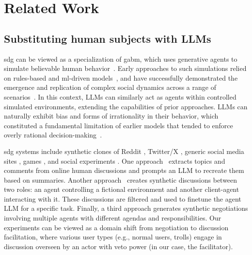 %
\section{Related Work}

\subsection{Substituting human subjects with LLMs}
\label{sec:related:human-llm}

\ac{sdg} can be viewed as a specialization of \ac{gabm}, which uses generative agents to simulate believable human behavior~\cite{park_simulacra}. Early approaches to such simulations relied on rules-based and \ac{ml}-driven models~\cite{epstein1999_abms}, and have successfully demonstrated the emergence and replication of complex social dynamics across a range of scenarios~\cite{Schelling1971,reynold_boids}. In this context, LLMs can similarly act as agents within controlled simulated environments, extending the capabilities of prior approaches. LLMs can naturally exhibit bias and forms of irrationality in their behavior, which constituted a fundamental limitation of earlier models that tended to enforce overly rational decision-making~\cite{adornetto2025_gabms}.

\ac{sdg} systems include synthetic clones of Reddit \cite{park_simulacra}, Twitter/X \cite{mou-etal-2024-unveiling}, generic social media sites \cite{tornberg_2023,y_social}, games \cite{park_2023_game}, and social experiments \cite{zhou_2024_sotopia, chuang-etal-2024-simulating,li-etal-2024-econagent}. One approach~\cite{balog_2024} extracts topics and comments from online human discussions and prompts an LLM to recreate them based on summaries. Another approach~\cite{ulmer2024} creates synthetic discussions between two roles: an agent controlling a fictional environment and another client-agent interacting with it. These discussions are filtered and used to finetune the agent LLM for a specific task. Finally, a third approach  \cite{abdelnabi_negotiations} generates synthetic negotiations involving multiple agents with different agendas and responsibilities. Our experiments can be viewed as a domain shift from negotiation to discussion facilitation, where various user types (e.g., normal users, trolls) engage in discussion overseen by an actor with veto power (in our case, the facilitator).


